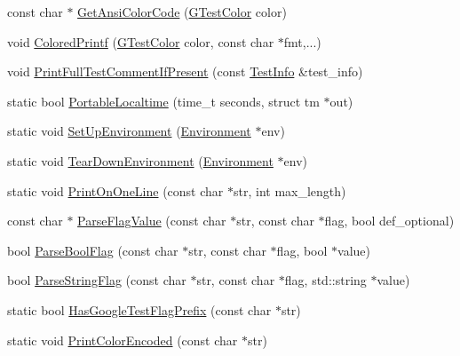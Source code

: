 \begin{DoxyCompactItemize}
\item 
const char $\ast$ \hyperlink{namespacetesting_1_1internal_a0aefb9deb60e90f19c236559837303d8}{Get\+Ansi\+Color\+Code} (\hyperlink{namespacetesting_1_1internal_a648c1bc94c2ef9e868ff3f9dff0f9c4e}{G\+Test\+Color} color)
\item 
void \hyperlink{namespacetesting_1_1internal_adef3055706176001364e54eb73a87e31}{Colored\+Printf} (\hyperlink{namespacetesting_1_1internal_a648c1bc94c2ef9e868ff3f9dff0f9c4e}{G\+Test\+Color} color, const char $\ast$fmt,...)
\item 
void \hyperlink{namespacetesting_1_1internal_a7a85ebe3b4de93a1edb091f92f1fb393}{Print\+Full\+Test\+Comment\+If\+Present} (const \hyperlink{classtesting_1_1TestInfo}{Test\+Info} \&test\+\_\+info)
\item 
static bool \hyperlink{namespacetesting_1_1internal_a60af94307ed4f00a57b5c6d9617c046d}{Portable\+Localtime} (time\+\_\+t seconds, struct tm $\ast$out)
\item 
static void \hyperlink{namespacetesting_1_1internal_a5f5535012d4548788a5d1a4e0f18e19e}{Set\+Up\+Environment} (\hyperlink{classtesting_1_1Environment}{Environment} $\ast$env)
\item 
static void \hyperlink{namespacetesting_1_1internal_ac467e871e4781da3f5ebed2a4465aec4}{Tear\+Down\+Environment} (\hyperlink{classtesting_1_1Environment}{Environment} $\ast$env)
\item 
static void \hyperlink{namespacetesting_1_1internal_a4a8708bfb808411f9d918c7356ae7362}{Print\+On\+One\+Line} (const char $\ast$str, int max\+\_\+length)
\item 
const char $\ast$ \hyperlink{namespacetesting_1_1internal_a8bfd56af5e4a89bfb76f7e1723e41b03}{Parse\+Flag\+Value} (const char $\ast$str, const char $\ast$flag, bool def\+\_\+optional)
\item 
bool \hyperlink{namespacetesting_1_1internal_ada3b98e7cfe93f4ba2053c470d9e3e51}{Parse\+Bool\+Flag} (const char $\ast$str, const char $\ast$flag, bool $\ast$value)
\item 
bool \hyperlink{namespacetesting_1_1internal_aa4ce312efaaf7a97aac2303173afe021}{Parse\+String\+Flag} (const char $\ast$str, const char $\ast$flag, std\+::string $\ast$value)
\item 
static bool \hyperlink{namespacetesting_1_1internal_a6fff795269f50673e358438721710d6f}{Has\+Google\+Test\+Flag\+Prefix} (const char $\ast$str)
\item 
static void \hyperlink{namespacetesting_1_1internal_a7d8c446a29c7e22d7d4dde8f530bb57e}{Print\+Color\+Encoded} (const char $\ast$str)

\end{DoxyCompactItemize}
